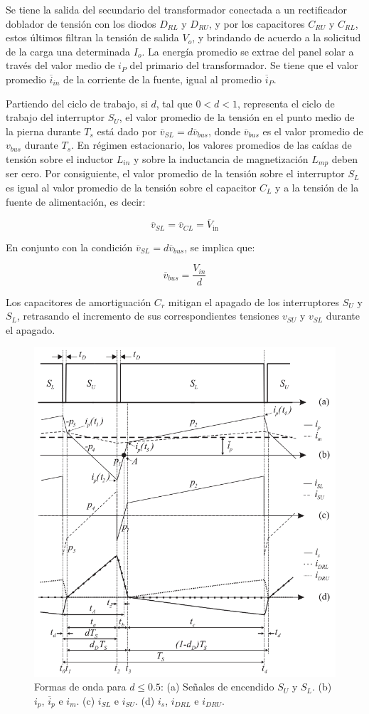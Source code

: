 Se tiene la salida del secundario del transformador conectada a un rectificador doblador de tensión con los diodos $D_{RL}$ y $D_{RU}$, y por los capacitores $C_{RU}$ y $C_{RL}$, estos últimos filtran la tensión de salida $V_o$, y brindando de acuerdo a la solicitud de la carga una determinada $I_o$. La energía promedio se extrae del panel solar a través del valor medio de $i_P$ del primario del transformador. Se tiene que el valor promedio $\overline{i}_{in}$ de la corriente de la fuente, igual al promedio $\overline{i}_P$.

Partiendo del ciclo de trabajo, si \( d \), tal que \( 0 < d < 1 \), representa el ciclo de trabajo del interruptor \( S_U \), el valor promedio de la tensión en el punto medio de la pierna durante \( T_s \) está dado por \(\overline{v}_{SL} = d\overline{v}_{bus}\), donde \(\overline{v}_{bus}\) es el valor promedio de \( v_{bus} \) durante \( T_s \). En régimen estacionario, los valores promedios de las caídas de tensión sobre el inductor \( L_{in} \) y sobre la inductancia de magnetización \( L_{mp} \) deben ser cero. Por consiguiente, el valor promedio de la tensión sobre el interruptor \( S_L \) es igual al valor promedio de la tensión sobre el capacitor \( C_L \) y a la tensión de la fuente de alimentación, es decir:

\[
\overline{v}_{SL} = \overline{v}_{CL} = \overline{V}_{\text{in}}
\]

En conjunto con la condición \(\overline{v}_{SL} = d\overline{v}_{bus}\), se implica que:

\[
\overline{v}_{bus} = \frac{V_{in}}{d}
\]

Los capacitores de amortiguación \( C_r \) mitigan el apagado de los interruptores \( S_U \) y \( S_L \), retrasando el incremento de sus correspondientes tensiones \( v_{SU} \) y \( v_{SL} \) durante el apagado.

\begin{figure}
	\centering
	\includegraphics[width=0.7\linewidth]{img/formaOnda1}
	\caption{Formas de onda para \( d \leq 0.5 \): (a) Señales de encendido \( S_U \) y \( S_L \). (b) \( i_p \), \( \overline{i}_p \) e \( i_m \). (c) \( i_{SL} \) e \( i_{SU} \). (d) \( i_s \), \( i_{DRL} \) e \( i_{DRU} \).}
	\label{fig:formaonda1}
\end{figure}

